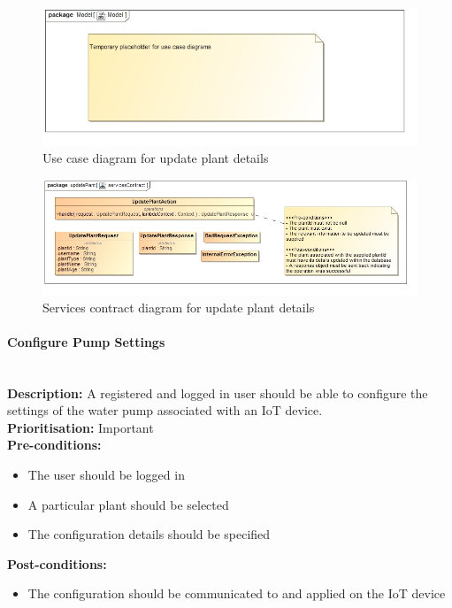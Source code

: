 \documentclass{article}
\begin{document}
		\begin{figure}[H]
			\includegraphics[width=\linewidth]{images/tempUseCase.jpg}
			\caption{Use case diagram for update plant details}
		\end{figure}
		
		\begin{figure}[H]
			\includegraphics[width=\linewidth]{images/ServicesContracts/updatePlant.jpg}
			\caption{Services contract diagram for update plant details}
		\end{figure}		
		
	\paragraph{Configure Pump Settings}\mbox{}\\
		\textbf{Description:} A registered and logged in user should be able to configure the settings of the water pump associated with an IoT device.\\
		\textbf{Prioritisation:} Important\\		
		\textbf{Pre-conditions:}
			\begin{itemize}
				\item The user should be logged in
				\item A particular plant should be selected
				\item The configuration details should be specified
			\end{itemize}
		\textbf{Post-conditions:}
			\begin{itemize}
				\item The configuration should be communicated to and applied on the IoT device
			\end{itemize}
\end{document}
